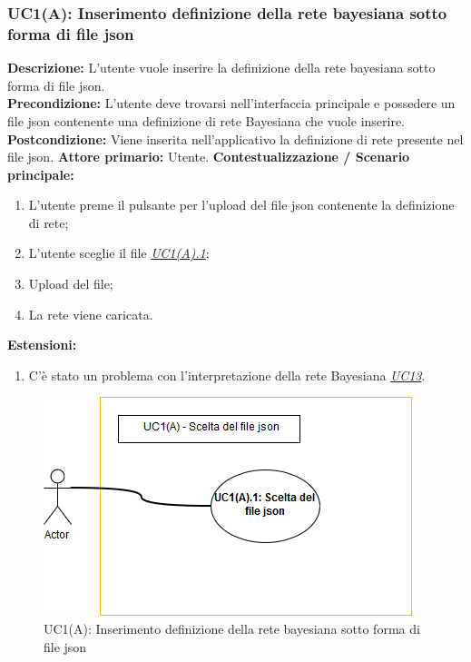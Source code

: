                         
                \subsubsection{UC1(A): Inserimento definizione della rete bayesiana sotto forma di file json}
                    \textbf{Descrizione:} L’utente vuole inserire la definizione della rete bayesiana sotto forma di file json.\\
                    \textbf{Precondizione:}  L’utente deve trovarsi nell'interfaccia principale e possedere un file json contenente una definizione di rete Bayesiana che vuole inserire.
                    \newline
                    \textbf{Postcondizione:} Viene inserita nell'applicativo la definizione di rete presente nel file json.
                    \newline
                    \textbf{Attore primario:} Utente.
                    \newline
                    \textbf{Contestualizzazione / Scenario principale:} \begin{enumerate}
                        \item L’utente preme il pulsante per l’upload del file json contenente la definizione di rete;
                        \item L’utente sceglie il file \underline{\textit{UC1(A).1}};
                        \item Upload del file;
                        \item La rete viene caricata.
                    \end{enumerate}
                    
                    \textbf{Estensioni:} \begin{enumerate}
                            \item C’è stato un problema con l’interpretazione della rete Bayesiana \underline{\textit{UC13}}.
                        \end{enumerate}
                        
                    \begin{figure}[!htbp]
                    	\centering
                    	\includegraphics[scale=0.8]{UC1(A).png}
                    	\caption{UC1(A): Inserimento definizione della rete bayesiana sotto forma di file json}
                    	\label{uc1a}
                    \end{figure}
                    
